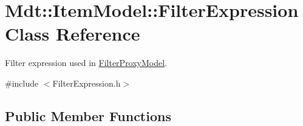 \hypertarget{class_mdt_1_1_item_model_1_1_filter_expression}{}\section{Mdt\+:\+:Item\+Model\+:\+:Filter\+Expression Class Reference}
\label{class_mdt_1_1_item_model_1_1_filter_expression}


Filter expression used in \hyperlink{class_mdt_1_1_item_model_1_1_filter_proxy_model}{Filter\+Proxy\+Model}.  




{\ttfamily \#include $<$Filter\+Expression.\+h$>$}

\subsection*{Public Member Functions}
